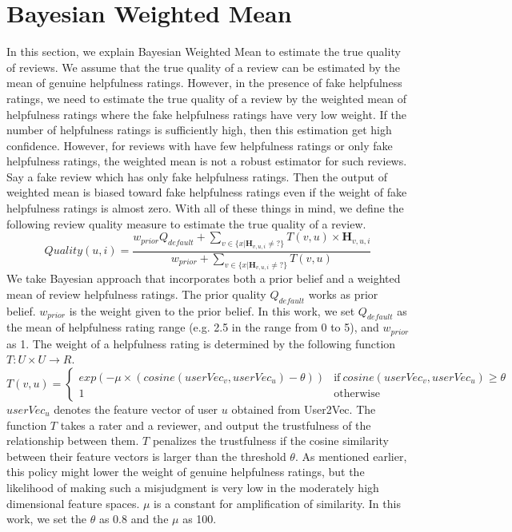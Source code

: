 \documentclass[master,english,final]{kaist-ucs}
\begin{document}
\section{Bayesian Weighted Mean}
In this section, we explain Bayesian Weighted Mean to estimate the true quality of reviews.
We assume that the true quality of a review can be estimated by the mean of genuine helpfulness ratings.
However, in the presence of fake helpfulness ratings, we need to estimate the true quality of a review by the weighted mean of helpfulness ratings where the fake helpfulness ratings have very low weight.
If the number of helpfulness ratings is sufficiently high, then this estimation get high confidence.
However, for reviews with have few helpfulness ratings or only fake helpfulness ratings, the weighted mean is not a robust estimator for such reviews.
Say a fake review which has only fake helpfulness ratings.
Then the output of weighted mean is biased toward fake helpfulness ratings even if the weight of fake helpfulness ratings is almost zero.
With all of these things in mind, we define the following review quality measure to estimate the true quality of a review.
\begin{equation}
Quality(u,i) = \frac{ w_{prior} Q_{default} + \sum_{v \in \{x|\bm{H}_{v,u,i} \neq ?\}} T(v,u) \times \bm{H}_{v,u,i} } {w_{prior}  + \sum_{v \in \{x|\bm{H}_{v,u,i} \neq ?\}} T(v,u) }
\end{equation}
We take Bayesian approach that incorporates both a prior belief and a weighted mean of review helpfulness ratings.
The prior quality $Q_{default}$ works as prior belief.
$w_{prior}$ is the weight given to the prior belief.
In this work, we set $Q_{default}$ as the mean of helpfulness rating range (e.g. 2.5 in the range from 0 to 5), and $w_{prior}$ as 1.
The weight of a helpfulness rating is determined by the following function $T: U \times U \rightarrow R$.
\begin{equation}
T(v,u)=
\begin{cases}
  exp(-\mu \times(cosine(userVec_v,userVec_u)-\theta)) & \text{if}\ cosine(userVec_v,userVec_u) \geq \theta \\
  1 & \text{otherwise}
\end{cases}
\end{equation}
$userVec_u$ denotes the feature vector of user $u$ obtained from User2Vec.
The function $T$ takes a rater and a reviewer, and output the trustfulness of the relationship between them.
$T$ penalizes the trustfulness if the cosine similarity between their feature vectors is larger than the threshold $\theta$.
As mentioned earlier, this policy might lower the weight of genuine helpfulness ratings, but the likelihood of making such a misjudgment is very low in the moderately high dimensional feature spaces.
$\mu$ is a constant for amplification of similarity.
In this work, we set the $\theta$ as 0.8 and the $\mu$ as 100.
\end{document}
